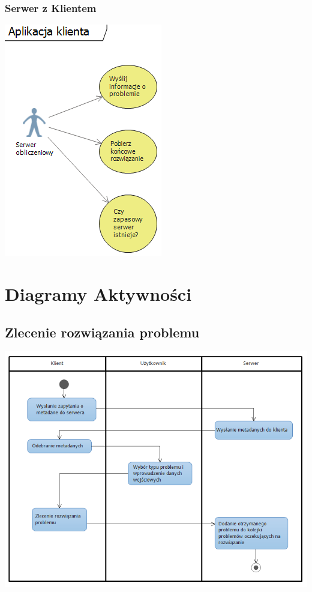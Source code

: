 \documentclass[12pt,a4paper,titlepage]{report}
\begin{document}
			
			\subsection{Serwer z Klientem}
			
			\includegraphics{img/diagram08.png}	
			
			
			
	\chapter{Diagramy Aktywności}
		\section{Zlecenie rozwiązania problemu}

		\includegraphics[width=\textwidth]{img/diagram1.png}		
		
\end{document}
